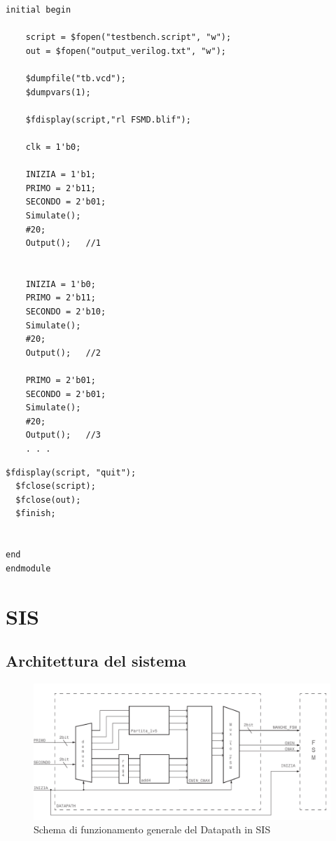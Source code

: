 \documentclass[a4paper]{report}
\begin{document}
\begin{lstlisting}[firstnumber=36]
  initial begin
    
    script = $fopen("testbench.script", "w");
    out = $fopen("output_verilog.txt", "w");

    $dumpfile("tb.vcd");
    $dumpvars(1);
    
    $fdisplay(script,"rl FSMD.blif");
    
    clk = 1'b0;

    INIZIA = 1'b1;  
    PRIMO = 2'b11;
    SECONDO = 2'b01;
    Simulate();			
    #20;
    Output();   //1

    
    INIZIA = 1'b0;
    PRIMO = 2'b11;
    SECONDO = 2'b10;
    Simulate();			
    #20;
    Output();   //2

    PRIMO = 2'b01;
    SECONDO = 2'b01;
    Simulate();		
    #20;
    Output();   //3
    . . .

\end{lstlisting}

\begin{lstlisting}[firstnumber=587]
  $fdisplay(script, "quit");
  $fclose(script);
  $fclose(out);
  $finish;


end
endmodule
\end{lstlisting}

\chapter{SIS}

\section{Architettura del sistema}


  \begin{figure}[ht]
    \centering
      \includegraphics[width=\textwidth]{datapath.pdf}
      \caption{Schema di funzionamento generale del Datapath in SIS}
      \label{img:datapath}
  \end{figure}
\end{document}
